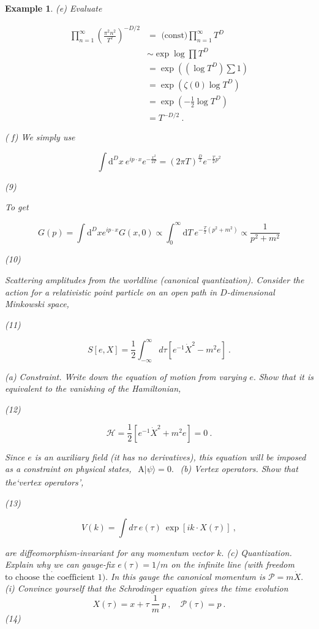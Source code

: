 \documentclass[10pt,
 article,
 amsmath,amssymb
]{revtex4-2}
\newtheorem{example}[theorem]{Example}
\begin{document}
\begin{example}
(e) Evaluate

$$\begin{aligned}\prod_{n=1}^\infty\left(\frac{\pi^2n^2}{T^2}\right)^{-D/2}&=\text{ (const)}\prod_{n=1}^\infty T^D\\&\sim\exp\log\prod T^D\\&=\exp((\log T^D)\sum1)\\&=\exp(\zeta(0)\log T^D)\\&=\exp(-\frac12\log T^D)\\&=T^{-D/2}\:.\end{aligned}$$

( f)  We simply use

$$\int\mathrm{d}^Dx\:e^{ip\cdot x}e^{-\frac{x^2}{2T}}=(2\pi T)^{\frac D2}e^{-\frac T2p^2}$$

(9)

To get

$$G(p)=\int\mathrm{d}^Dxe^{ip\cdot x}G(x,0)\propto\int_0^\infty\mathrm{d}T\:e^{-\frac T2(p^2+m^2)}\propto\frac1{p^2+m^2}$$

(10)

Scattering amplitudes from the worldline (canonical quantization).
Consider the action for a relativistic point particle on an open path in $D$-dimensional Minkowski
space,

(11)

$$S[e,X]=\frac{1}{2}\int_{-\infty}^{\infty}d\tau\left[e^{-1}\dot{X}^{2}-m^{2}e\right]\:.$$

(a) Constraint. Write down the equation of motion from varying $e.$ Show that it is equivalent
to the vanishing of the Hamiltonian,

(12)

$$\mathcal{H}=\frac12[e^{-1}\dot{X}^2+m^2e]=0\:.$$

Since $e$ is an auxiliary field (it has no derivatives), this equation will be imposed as a
constraint on physical states, $\begin{aligned}\text{A}|\psi\rangle=0.\end{aligned}$
(b) Vertex operators. Show that the‘vertex operators’,


(13)

$$V(k)=\int d\tau\:e(\tau)\:\exp\left[ik\cdot X(\tau)\right]\:,$$

are diffeomorphism-invariant for any momentum vector $k.$
(c) Quantization. Explain why we can gauge-fix $e(\tau)=1/m$ on the infinite line (with freedom
$\dot{\text{to choose the coefficient }1}).$ In this gauge the canonical momentum is $\mathcal{P}=m\dot{X}.$
(i) Convince yourself that the Schrodinger equation gives the time evolution
$$X(\tau)=x+\tau\:\frac{1}{m}\:p\:,\quad\mathcal{P}(\tau)=p\:.$$
(14)



\end{example}
\end{document}
